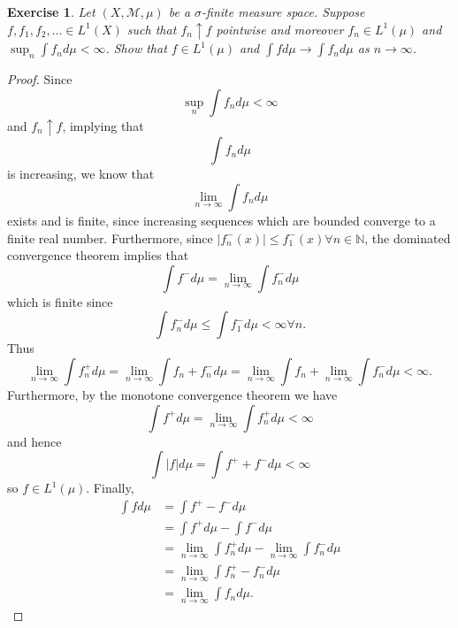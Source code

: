 \documentclass{article}
\newtheorem{exercise}[theorem]{Exercise}
\begin{document}
\begin{exercise}
Let \( (X, \mathcal{M}, \mu) \) be a \(\sigma\)-finite measure space. Suppose \( f, f_1, f_2, \dots \in L^1(X) \) such that \( f_n \uparrow f \) pointwise and moreover \( f_n \in L^1(\mu) \) and \( \sup_n \int f_n d\mu < \infty \). Show that \( f \in L^1(\mu) \) and \( \int f d\mu \to \int f_n d\mu \) as \( n \to \infty \).
\end{exercise}
\begin{proof}
 Since \[\sup_n\int f_nd\mu<\infty\]and $f_n\uparrow f$, implying that \[\int f_nd\mu\] is increasing, we know that \[\lim_{n\to\infty}\int f_nd\mu\] exists and is finite, since increasing sequences which are bounded converge to a finite real number. Furthermore, since $|f_n^-(x)|\leq f_1^-(x)\forall n\in\mathbb{N}$, the dominated convergence theorem implies that \[\int f^-d\mu=\lim_{n\to\infty}\int f_n^-d\mu\] which is finite since \[\int f_n^-d\mu\leq\int f_1^-d\mu<\infty\forall n.\]Thus \[\lim_{n\to\infty}\int f_n^+d\mu=\lim_{n\to\infty}\int f_n+f_n^-d\mu=\lim_{n\to\infty}\int f_n+\lim_{n\to\infty}\int f_n^-d\mu<\infty.\] Furthermore, by the monotone convergence theorem we have\[\int f^+d\mu=\lim_{n\to\infty}\int f_n^+d\mu<\infty\] and hence \[\int |f|d\mu=\int f^++f^-d\mu<\infty\] so $f\in L^1(\mu)$. Finally,\begin{align*}\int fd\mu&=\int f^+-f^-d\mu\\&=\int f^+d\mu-\int f^-d\mu\\&=\lim_{n\to\infty}\int f_n^+d\mu-\lim_{n\to\infty}\int f_n^-d\mu\\&=\lim_{n\to\infty}\int f_n^+-f_n^-d\mu\\&=\lim_{n\to\infty}\int f_nd\mu.\end{align*}
\end{proof}
\end{document}
